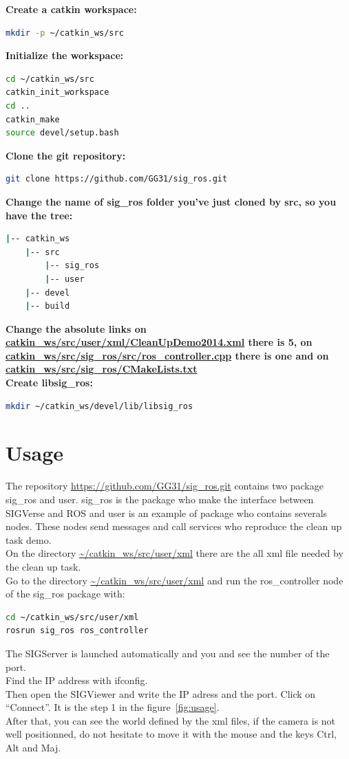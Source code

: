 \documentclass[notitlepage]{report}
\begin{document}
\noindent\textbf{Create a catkin workspace:} 
\begin{lstlisting}[language=bash]
mkdir -p ~/catkin_ws/src
\end{lstlisting}
\textbf{Initialize the workspace:} 
\begin{lstlisting}[language=bash]
cd ~/catkin_ws/src
catkin_init_workspace
cd ..
catkin_make
source devel/setup.bash
\end{lstlisting}
\textbf{Clone the git repository:}
\begin{lstlisting}[language=bash]
git clone https://github.com/GG31/sig_ros.git
\end{lstlisting}
\textbf{Change the name of sig\_ros folder you've just cloned by src, so you have the tree:}
\begin{lstlisting}[language=bash]
|-- catkin_ws
    |-- src
        |-- sig_ros
        |-- user
    |-- devel
    |-- build
\end{lstlisting}
\textbf{Change the absolute links on \url{catkin_ws/src/user/xml/CleanUpDemo2014.xml} there is 5, on \url{catkin_ws/src/sig_ros/src/ros_controller.cpp} there is one and on \url{catkin_ws/src/sig_ros/CMakeLists.txt}}\\
\textbf{Create libsig\_ros:} 
\begin{lstlisting}[language=bash]
mkdir ~/catkin_ws/devel/lib/libsig_ros
\end{lstlisting}

\chapter{Usage}
The repository \url{https://github.com/GG31/sig_ros.git} contains two package sig\_ros and user. sig\_ros is the package who make the interface between SIGVerse and ROS and user is an example of package who contains severals nodes. These nodes send messages and call services who reproduce the clean up task demo.\\
On the directory \url{~/catkin_ws/src/user/xml} there are the all xml file needed by the clean up task.\\

Go to the directory \url{~/catkin_ws/src/user/xml} and run the ros\_controller node of the sig\_ros package with:
\begin{lstlisting}[language=bash]
cd ~/catkin_ws/src/user/xml
rosrun sig_ros ros_controller
\end{lstlisting}
The SIGServer is launched automatically and you and see the number of the port.\\
Find the IP address with ifconfig.\\
Then open the SIGViewer and write the IP adress and the port. Click on ``Connect''. It is the step 1 in the figure~\ref{fig:usage}.\\
After that, you can see the world defined by the xml files, if the camera is not well positionned, do not hesitate to move it with the mouse and the keys Ctrl, Alt and Maj.\\
\end{document}
